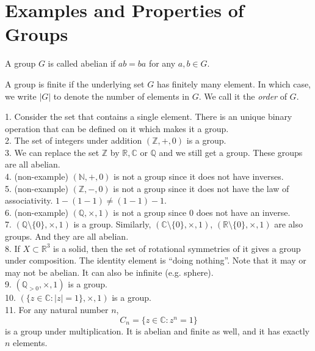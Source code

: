 \section{Examples and Properties of Groups}
\begin{definition}
    A group $G$ is called abelian if $ab=ba$ for any $a,b\in G$.
\end{definition}
\begin{definition}
    A group is finite if the underlying set $G$ has finitely many element.
    In which case, we write $|G|$ to denote the number of elements in $G$.
    We call it the \textit{order} of $G$.
\end{definition}
\begin{example}
    1. Consider the set that contains a single element.
    There is an unique binary operation that can be defined on it which makes it a group.\\
    2. The set of integers under addition $(\mathbb Z, +, 0)$ is a group.\\
    3. We can replace the set $\mathbb Z$ by $\mathbb R, \mathbb C$ or $\mathbb Q$ and we still get a group.
    These groups are all abelian.\\
    4. (non-example) $(\mathbb N, +, 0)$ is not a group since it does not have inverses.\\
    5. (non-example) $(\mathbb Z, -, 0)$ is not a group since it does not have the law of associativity.
    $1-(1-1)\neq (1-1)-1$.\\
    6. (non-example) $(\mathbb Q, \times, 1)$ is not a group since $0$ does not have an inverse.\\
    7. $(\mathbb Q\setminus \{0\},\times, 1)$ is a group.
    Similarly, $(\mathbb C\setminus \{0\},\times, 1)$, $(\mathbb R\setminus \{0\},\times, 1)$ are also groups.
    And they are all abelian.\\
    8. If $X\subset\mathbb R^3$ is a solid, then the set of rotational symmetries of it gives a group under composition.
    The identity element is ``doing nothing''.
    Note that it may or may not be abelian.
    It can also be infinite (e.g. sphere).\\
    9. $(\mathbb Q_{>0}, \times, 1)$ is a group.\\
    10. $(\{z\in\mathbb C: |z|=1\}, \times, 1)$ is a group.\\
    11. For any natural number $n$,
    $$C_n=\{z\in\mathbb C: z^n=1\}$$
    is a group under multiplication.
    It is abelian and finite as well, and it has exactly $n$ elements.\\

\end{example}
